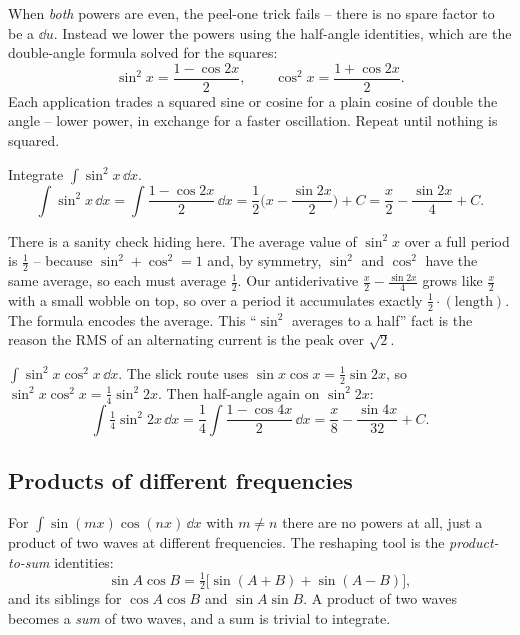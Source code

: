 When \emph{both} powers are even, the peel-one trick fails -- there is no spare
factor to be a $\dd u$. Instead we lower the powers using the half-angle
identities, which are the double-angle formula solved for the squares:
\[
\sin^2 x = \frac{1 - \cos 2x}{2},
\qquad
\cos^2 x = \frac{1 + \cos 2x}{2}.
\]
Each application trades a squared sine or cosine for a plain cosine of double
the angle -- lower power, in exchange for a faster oscillation. Repeat until
nothing is squared.

\begin{example}
\label{ch24:ex-even}
Integrate $\displaystyle \int \sin^2 x\,\dd x.$
\[
\int \sin^2 x\,\dd x
= \int \frac{1 - \cos 2x}{2}\,\dd x
= \frac{1}{2}\Big(x - \frac{\sin 2x}{2}\Big) + C
= \frac{x}{2} - \frac{\sin 2x}{4} + C.
\]
\end{example}

\begin{intuitionbox}
There is a sanity check hiding here. The average value of $\sin^2 x$ over a
full period is $\tfrac{1}{2}$ -- because $\sin^2 + \cos^2 = 1$ and, by
symmetry, $\sin^2$ and $\cos^2$ have the same average, so each must average
$\tfrac{1}{2}$. Our antiderivative $\tfrac{x}{2} - \tfrac{\sin 2x}{4}$ grows
like $\tfrac{x}{2}$ with a small wobble on top, so over a period it
accumulates exactly $\tfrac{1}{2}\cdot(\text{length})$. The formula encodes
the average. This ``$\sin^2$ averages to a half'' fact is the reason the RMS
of an alternating current is the peak over $\sqrt 2$.
\end{intuitionbox}

\begin{example}
$\displaystyle \int \sin^2 x\cos^2 x\,\dd x.$ The slick route uses
$\sin x\cos x = \tfrac{1}{2}\sin 2x$, so $\sin^2 x\cos^2 x =
\tfrac{1}{4}\sin^2 2x$. Then half-angle again on $\sin^2 2x$:
\[
\int \tfrac{1}{4}\sin^2 2x\,\dd x
= \frac{1}{4}\int \frac{1 - \cos 4x}{2}\,\dd x
= \frac{x}{8} - \frac{\sin 4x}{32} + C.
\]
\end{example}

\subsection{Products of different frequencies}

For $\int \sin(mx)\cos(nx)\,\dd x$ with $m \neq n$ there are no powers at all,
just a product of two waves at different frequencies. The reshaping tool is the
\emph{product-to-sum} identities:
\[
\sin A\cos B = \tfrac{1}{2}\big[\sin(A+B) + \sin(A-B)\big],
\]
and its siblings for $\cos A\cos B$ and $\sin A\sin B$. A product of two waves
becomes a \emph{sum} of two waves, and a sum is trivial to integrate.

